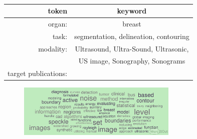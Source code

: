 \begin{table}[!ht]
\begin{adjustwidth}{-2.25in}{0in} %
\caption{
{\bf {}}}
    \begin{tabular}{r|c}
      token & keyword\\
      \hline
      organ: & breast \\
      task: & segmentation, delineation, contouring \\
      modality: & Ultrasound, Ultra-Sound, Ultrasonic, \\
      & US image, Sonography, Sonograms \\
      target publications: & %
    \end{tabular}
    \begin{flushleft} 
\end{flushleft}
\label{table1}
\end{adjustwidth}
\end{table}

\begin{figure}
    \centering
    \includegraphics[width=3.0in]{wcloud}
    \caption{}%
    \label{fig:wcloud}
\end{figure}

